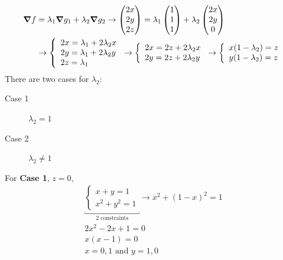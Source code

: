 \documentclass{article}
\numberwithin{equation}{subsection} %
\begin{document}
\begin{equation}
    \begin{split}
        \grad f &= \lambda_1 \grad g_1 + \lambda_2 \grad g_2 \to \begin{pmatrix}
            2x\\2y\\2z
        \end{pmatrix}
        = \lambda_1 \begin{pmatrix}
            1\\1\\1
        \end{pmatrix}
        + \lambda_2 \begin{pmatrix}
            2x\\2y\\0
        \end{pmatrix}
        \\
        &\to \left\{
        \begin{array}{ll}
            2x=\lambda_1+2\lambda_2 x \\
            2y = \lambda_1 + 2\lambda_2 y \\
            2z = \lambda_1
        \end{array}
        \right.
        \to \left\{
        \begin{array}{ll}
            2x = 2z+2\lambda_2 x \\
            2y = 2z + 2\lambda_2 y
        \end{array}
        \right.
        \to \left\{
        \begin{array}{ll}
            x(1-\lambda_2) = z \\
            y(1-\lambda_2) = z
        \end{array}
        \right.
    \end{split}
\end{equation}
There are two cases for $\lambda_2$:
\begin{description}
    \item[Case 1] $\lambda_2 = 1$
    \item[Case 2] $\lambda_2 \neq 1$
\end{description}
For \textbf{Case 1}, $z=0$,
\begin{equation}
    \begin{split}
        \underbracket{\left\{ \begin{array}{ll}
        x+y=1 \\ x^2+y^2=1
        \end{array}
        \right.}_{\text{2 constraints}}
        \to x^2+(1-x)^2 = 1
        \\
        2x^2-2x+1 = 0 
        \\
        x(x-1) = 0 \\
        x = 0,1\text{ and } y=1,0
    \end{split}
\end{equation}
\end{document}
